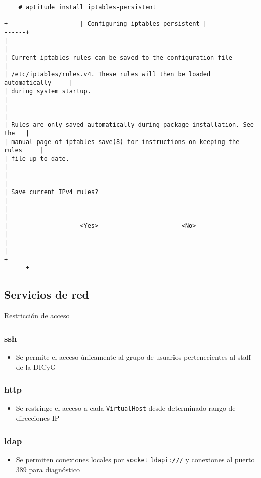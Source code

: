 {
\scriptsize
\linespread{1}
\begin{verbatim}
    # aptitude install iptables-persistent

+--------------------| Configuring iptables-persistent |--------------------+
|                                                                           |
| Current iptables rules can be saved to the configuration file             |
| /etc/iptables/rules.v4. These rules will then be loaded automatically     |
| during system startup.                                                    |
|                                                                           |
| Rules are only saved automatically during package installation. See the   |
| manual page of iptables-save(8) for instructions on keeping the rules     |
| file up-to-date.                                                          |
|                                                                           |
| Save current IPv4 rules?                                                  |
|                                                                           |
|                    <Yes>                       <No>                       |
|                                                                           |
+---------------------------------------------------------------------------+
\end{verbatim}
}

      \subsection {Servicios de red}

Restricci\'{o}n de acceso

        \subsubsection {ssh}

\begin{itemize}
  \item Se permite el acceso \'{u}nicamente al grupo de usuarios pertenecientes al staff de la DICyG
\end{itemize}

        \subsubsection {http}

\begin{itemize}
  \item Se restringe el acceso a cada \texttt{VirtualHost} desde determinado rango de direcciones IP
\end{itemize}

        \subsubsection {ldap}

\begin{itemize}
  \item Se permiten conexiones locales por \texttt{socket} \texttt{ldapi:///} y conexiones al puerto 389 para diagn\'{o}stico
\end{itemize}

